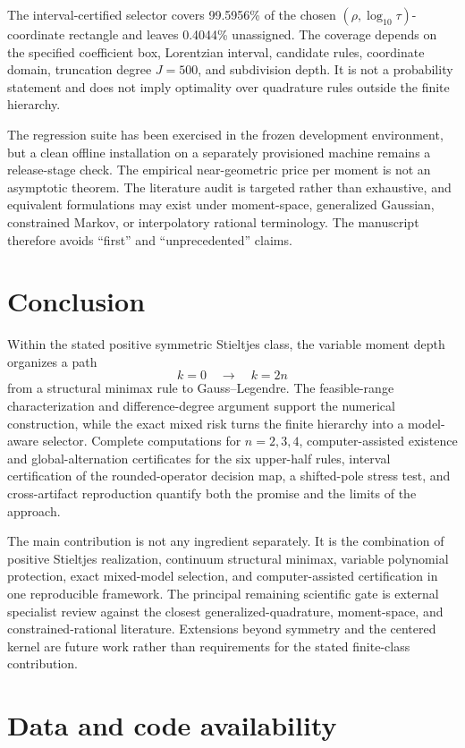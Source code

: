 \documentclass[preprint,12pt]{elsarticle}
\theoremstyle{remark}
\begin{document}
The interval-certified selector covers 99.5956\% of the chosen
\((\rho,\log_{10}\tau)\)-coordinate rectangle and leaves 0.4044\%
unassigned. The coverage depends on the specified coefficient box,
Lorentzian interval, candidate rules, coordinate domain, truncation
degree \(J=500\), and subdivision depth. It is not a probability
statement and does not imply optimality over quadrature rules outside
the finite hierarchy.

The regression suite has been exercised in the frozen development
environment, but a clean offline installation on a separately
provisioned machine remains a release-stage check. The empirical
near-geometric price per moment is not an asymptotic theorem. The
literature audit is targeted rather than exhaustive, and equivalent
formulations may exist under moment-space, generalized Gaussian,
constrained Markov, or interpolatory rational terminology. The
manuscript therefore avoids ``first'' and ``unprecedented'' claims.

\section{Conclusion}

Within the stated positive symmetric Stieltjes class, the variable
moment depth organizes a path
\[
k=0
\quad\longrightarrow\quad
k=2n
\]
from a structural minimax rule to Gauss--Legendre. The feasible-range
characterization and difference-degree argument support the numerical
construction, while the exact mixed risk turns the finite hierarchy
into a model-aware selector. Complete computations for \(n=2,3,4\),
computer-assisted existence and global-alternation certificates for the
six upper-half rules, interval certification of the rounded-operator
decision map, a shifted-pole stress test, and cross-artifact
reproduction quantify both the promise and the limits of the approach.

The main contribution is not any ingredient separately. It is the
combination of positive Stieltjes realization, continuum structural
minimax, variable polynomial protection, exact mixed-model selection,
and computer-assisted certification in one reproducible framework.
The principal remaining scientific gate is external specialist review
against the closest generalized-quadrature, moment-space, and
constrained-rational literature. Extensions beyond symmetry and the
centered kernel are future work rather than requirements for the stated
finite-class contribution.

\section*{Data and code availability}
\end{document}
